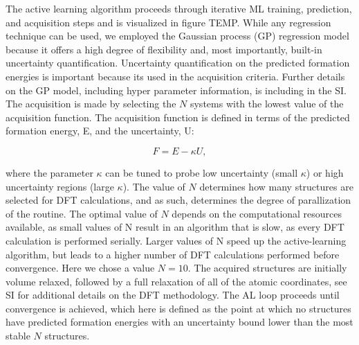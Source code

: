 The active learning algorithm proceeds through iterative ML training, prediction, and acquisition steps and is visualized in figure TEMP.
%
While any regression technique can be used, we employed the Gaussian process (GP) regression model because it offers a high degree of flexibility and, most importantly, built-in uncertainty quantification.
Uncertainty quantification on the predicted formation energies is important because its used in the acquisition criteria.
%
Further details on the GP model, including hyper parameter information, is including in the SI.
%
The acquisition is made by selecting the $N$ systems with the lowest value of the acquisition function.
%
The acquisition function is defined in terms of the predicted formation energy, E, and the uncertainty, U:

\begin{equation}
    F = E - \kappa U,
\end{equation}

where the parameter $\kappa$ can be tuned to probe low uncertainty (small $\kappa$) or high uncertainty regions  (large $\kappa$).
%
The value of $N$ determines how many structures are selected for DFT calculations,
and as such, determines the degree of parallization of the routine. The optimal value of $N$ depends on the computational resources available, as small values of N result in an algorithm that is slow, as every DFT calculation is performed serially.
Larger values of N speed up the active-learning algorithm, but leads to a higher number of DFT calculations performed before convergence. %
%
Here we chose a value $N=10$.
%
The acquired structures are initially volume relaxed, followed by a full relaxation of all of the atomic coordinates,
see SI for additional details on the DFT methodology.
The AL loop proceeds until convergence is achieved, which here is defined as the point at which %
no structures have predicted formation energies with an uncertainty bound lower than the most stable $N$ structures.


